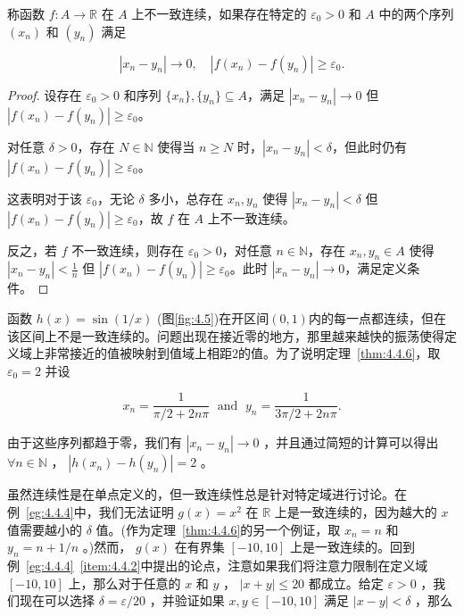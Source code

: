 \begin{Thm}[非一致连续性的序列准则]
  \label{thm:4.4.6}
称函数 \(f : A \rightarrow  \mathbb{R}\) 在 \(A\) 上不一致连续，如果存在特定的 \({\varepsilon }_{0} > 0\) 和 \(A\) 中的两个序列 \(\left( {x}_{n}\right)\) 和 \(\left( {y}_{n}\right)\) 满足

\[
\left| {{x}_{n} - {y}_{n}}\right|  \rightarrow  0, \quad\left| {f\left( {x}_{n}\right)  - f\left( {y}_{n}\right) }\right|  \geq  {\varepsilon }_{0}.
\]  
\end{Thm}

\begin{proof}
  设存在 \( \varepsilon_0 > 0 \) 和序列 \( \{x_n\}, \{y_n\} \subseteq A \)，满足 \( |x_n - y_n| \rightarrow 0 \) 但 \( |f(x_n) - f(y_n)| \geq \varepsilon_0 \)。
  
  对任意 \( \delta > 0 \)，存在 \( N\in \mathbb{N} \) 使得当 \( n \geq N \) 时，\( |x_n - y_n| < \delta \)，但此时仍有 \( |f(x_n) - f(y_n)| \geq \varepsilon_0 \)。
  
这表明对于该 \( \varepsilon_0 \)，无论 \( \delta \) 多小，总存在 \( x_n, y_n \) 使得 \( |x_n - y_n| < \delta \) 但 \( |f(x_n) - f(y_n)| \geq \varepsilon_0 \)，故 \( f \) 在 \( A \) 上不一致连续。  

反之，若 \( f \) 不一致连续，则存在 \( \varepsilon_0 > 0 \)，对任意 \( n \in \mathbb{N} \)，存在 \( x_n, y_n \in A \) 使得 \( |x_n - y_n| < \frac{1}{n} \) 但 \( |f(x_n) - f(y_n)| \geq \varepsilon_0 \)。此时 \( |x_n - y_n| \rightarrow 0 \)，满足定义条件。  
\end{proof}


\begin{Eg}
  \label{eg:4.4.7}
函数 \(h\left( x\right)  = \sin \left( {1/x}\right)\) (图\ref{fig:4.5})在开区间$(0,1)$内的每一点都连续，但在该区间上不是一致连续的。问题出现在接近零的地方，那里越来越快的振荡使得定义域上非常接近的值被映射到值域上相距$2$的值。为了说明定理~\ref{thm:4.4.6}，取 \({\varepsilon }_{0} = 2\) 并设

\[
{x}_{n} = \frac{1}{\pi /2 + {2n\pi }}\;\text{ and }\;{y}_{n} = \frac{1}{{3\pi }/2 + {2n\pi }}.
\]

由于这些序列都趋于零，我们有 \(\left| {{x}_{n} - {y}_{n}}\right|  \rightarrow  0\) ，并且通过简短的计算可以得出 \(\forall n \in  \mathbb{N}\) ， \(\left| {h\left( {x}_{n}\right)  - h\left( {y}_{n}\right) }\right|  = 2\) 。
\end{Eg}

虽然连续性是在单点定义的，但一致连续性总是针对特定域进行讨论。在例~\ref{eg:4.4.4}中，我们无法证明 \(g\left( x\right)  = {x}^{2}\) 在 \(\mathbb{R}\) 上是一致连续的，因为越大的 \(x\) 值需要越小的 \(\delta\) 值。(作为定理~\ref{thm:4.4.6}的另一个例证，取 \({x}_{n} = n\) 和 \({y}_{n} = n + 1/n\) 。)然而， \(g\left( x\right)\) 在有界集 \(\left\lbrack  {-{10},{10}}\right\rbrack\) 上是一致连续的。回到例~\ref{eg:4.4.4}~\ref{item:4.4.2}中提出的论点，注意如果我们将注意力限制在定义域 \(\left\lbrack  {-{10},{10}}\right\rbrack\) 上，那么对于任意的 \(x\) 和 \(y\) ， \(\left| {x + y}\right|  \leq  {20}\) 都成立。给定 \(\varepsilon  > 0\) ，我们现在可以选择 \(\delta  = \varepsilon /{20}\) ，并验证如果 \(x,y \in  \left\lbrack  {-{10},{10}}\right\rbrack\) 满足 \(\left| {x - y}\right|  < \delta\) ，那么

